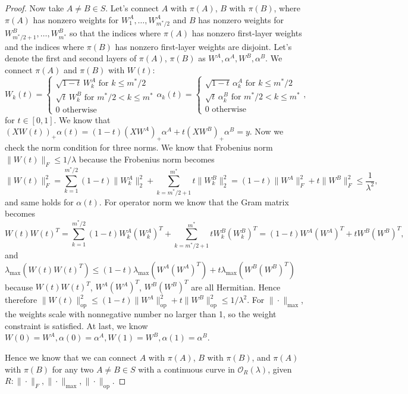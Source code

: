 \documentclass{article}
\newcommand{\op}{\mathrm{op}}
\begin{document}
\begin{proof}
Now take $A \ne B \in S$. Let's connect $A$ with $\pi(A)$, $B$ with $\pi(B)$, where $\pi(A)$ has nonzero weights for $W_1^A, \dots, W_{m^*/2}^A$ and $B$ has nonzero weights for $W_{m^*/2+1}^B, \dots, W_{m^*}^B$ so that the indices where $\pi(A)$ has nonzero first-layer weights and the indices where $\pi(B)$ has nonzero first-layer weights are disjoint. Let's denote the first and second layers of $\pi(A)$, $\pi(B)$ as $W^{A}, \alpha^{A}, W^{B}, \alpha^{B}$. We connect $\pi(A)$ and $\pi(B)$ with $W(t)$:
\[ 
W_k(t) = \begin{cases} 
\sqrt{1-t}\, W_k^A \text{ for } k \le m^*/2 \\[4pt]
\sqrt{t}\, W_k^B \text{ for } m^*/2 < k \le m^* \\[4pt]
0 \text{ otherwise} \end{cases} 
\alpha_k(t) = \begin{cases} \sqrt{1-t}\, \alpha_k^A \text{ for } k \le m^*/2 \\[4pt] 
\sqrt{t}\, \alpha_k^B \text{ for } m^*/2 < k \le m^* \\[4pt]
0 \text{ otherwise} \end{cases},
\]
for $t \in [0,1]$. We know that $(XW(t))_+ \alpha(t) = (1-t)(XW^A)_+ \alpha^A + t(XW^B)_+ \alpha^B = y$.
Now we check the norm condition for three norms. We know that Frobenius norm $\|W(t)\|_F \le 1/\lambda$ because the Frobenius norm becomes 
\[
\| W(t) \|_F^2 = \sum_{k=1}^{m^{*}/2} (1-t)\| W_k^{A}\|_2^2 + \sum_{k = m^{*}/2+1}^{m^{*}} t \|W_k^{B} \|_2^2 = (1-t) \| W^A\|_F^2 + t\|W^B\|_F^2 \leq \frac{1}{\lambda^2},
\]
and same holds for $\alpha(t)$. 
For operator norm we know that the Gram matrix becomes
\[
W(t)W(t)^{T} = \sum_{k=1}^{m^{*}/2} (1-t) W_k^A(W_k^A)^{T} + \sum_{k=m^{*}/2+1}^{m^{*}} t W_k^{B}(W_k^{B})^{T} = (1-t)W^{A}(W^{A})^{T} + tW^{B}(W^{B})^{T},
\]
and $\lambda_{\max}(W(t)W(t)^{T}) \leq (1-t) \lambda_{\max}(W^A(W^A)^{T}) + t\lambda_{\max}(W^B(W^B)^{T})$ because $W(t)W(t)^{T}$, $W^A(W^A)^{T}$, $W^B(W^B)^T$ are all Hermitian. Hence 
therefore $\|W(t)\|_{\op}^2 \le (1-t)\|W^A\|_{\op}^2 + t\|W^B\|_{\op}^2 \leq 1/\lambda^2$. For $\| \cdot \|_{\max}$, the weights scale with nonnegative number no larger than 1, so the weight constraint is satisfied. At last, we know $W(0) = W^{A}, \alpha(0) = \alpha^{A}, W(1) = W^{B}, \alpha(1) = \alpha^{B}$.

Hence we know that we can connect $A$ with $\pi(A)$, $B$ with $\pi(B)$, and $\pi(A)$ with $\pi(B)$ for any two $A \ne B \in S$ with a continuous curve in $\mathcal{O}_R(\lambda)$, given $R: \|\cdot\|_F, \|\cdot\|_{\max}, \|\cdot\|_{\op}$.
\end{proof}
\end{document}
